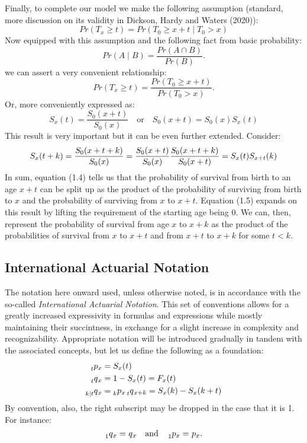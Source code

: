 \documentclass[a4paper]{report}
\newcommand{\q}[2]{\prescript{}{#1}{q}_{#2}}
\newcommand{\p}[2]{\prescript{}{#1}{p}_{#2}}
\begin{document}
   Finally, to complete our model we make the following
   assumption 
   (standard, more discussion on its validity in 
   Dickson, Hardy and Waters (2020)):
   \begin{equation}
     Pr(T_x \ge t) = Pr(T_0 \ge x + t \mid T_0 > x)
   \end{equation}
   Now equipped with this assumption and the following fact
   from basic probability:
   \[
     Pr(A \mid B) = \frac{Pr(A \cap B)}{Pr(B)}
   .\] 
   we can assert a very convenient relationship:
   \[
     Pr(T_x \ge t) = \frac{Pr(T_0 \ge x + t)}{Pr(T_0 > x)}
   .\] 
   Or, more conveniently expressed as:
   \begin{equation}
     S_x(t) = \frac{S_0(x+t)}{S_0(x)}
     \quad \text{or} \quad
     S_0(x+t) = S_0(x)S_x(t)
   \end{equation}
   This result is very important but it can be even further 
   extended.
   Consider:
   \begin{equation}
     S_x(t+k) = \frac{S_0(x+t+k)}{S_0(x)}
     = \frac{S_0(x+t)}{S_0(x)}\frac{S_0(x+t+k)}{S_0(x+t)} \\
     = S_x(t)S_{x+t}(k)
   \end{equation}
   In sum, equation (1.4) tells us that the probability 
   of survival from birth to an age $x+t$ can be split up
   as the product of the probability of surviving from 
   birth to $x$ and the probability of surviving from $x$
   to $x+t$.
   Equation (1.5) expands on this result by lifting the 
   requirement of the starting age being 0.
   We can, then, represent the probability of survival from 
   age $x$ to $x+k$ as the product of the probabilities of
   survival from $x$ to $x+t$ and from $x+t$ to $x+k$ for 
   some $t < k$.

   \subsection{International Actuarial Notation}
   \label{notation}
   The notation here onward used, unless otherwise noted,
   is in accordance with the so-called 
   \textit{International Actuarial Notation}. 
   This set of conventions allows for a greatly increased 
   expressivity in formulas and expressions while mostly 
   maintaining their succintness, in exchange for a slight 
   increase in complexity and recognizability.
   Appropriate notation will be introduced gradually in 
   tandem with the associated concepts, but let us define 
   the following as a foundation:
   \begin{align}
     \p{t}{x} &= S_x(t) \\
     \q{t}{x} &= 1 - S_x(t) = F_x(t) \\
     \q{k \mid t}{x} &= \p{k}{x}\q{t}{x+k} 
     = S_x(k) - S_x(k+t)
   \end{align}
   By convention, also, the right subscript may be dropped 
   in the case that it is 1. For instance:
   \[
     \q{1}{x} = \q{}{x} 
     \quad \text{and} \quad 
     \p{1}{x} = \p{}{x}
   .\] 
\end{document}
